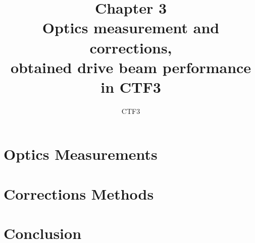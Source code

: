 \documentclass[]{ctfreport}
\title{Chapter 3  \\ 
       Optics measurement and corrections, \\
       obtained drive beam performance in CTF3}
\author{CTF3}
\begin{document}
\maketitle

%

\listoftodos
\newpage

\tableofcontents
\newpage 

\addtocounter{chapter}{2}




%









\section{Optics Measurements}












\section{Corrections Methods}

















\section{Conclusion}

\newpage 



\newpage 
\printbibliography[title={References}]
\end{document}
